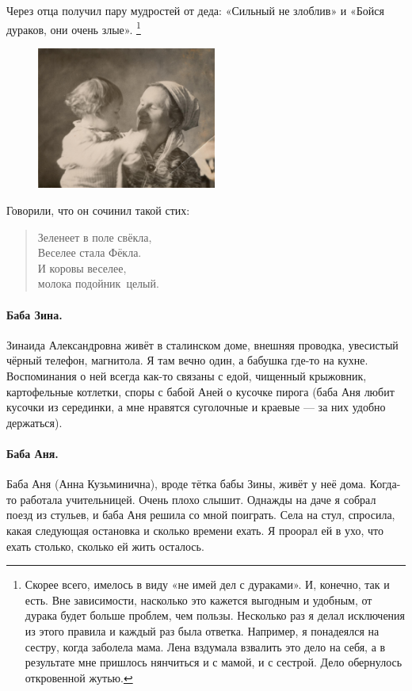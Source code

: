 \documentclass{book}
\begin{document}
Через отца получил пару мудростей от деда: «Сильный не злоблив» и «Бойся дураков, они очень злые».%
\footnote{Скорее всего, имелось в виду «не имей дел с дураками». 
И, конечно, так и есть.
Вне зависимости, насколько это кажется выгодным и удобным, от дурака будет больше проблем, чем пользы.
Несколько раз я делал исключения из этого правила и каждый раз была ответка.
Например, я понадеялся на сестру, когда заболела мама.
Лена вздумала взвалить это дело на себя, а в результате мне пришлось нянчиться и с мамой, и с сестрой.
Дело обернулось откровенной жутью.}

\begin{figure}
\vskip-4mm
\centering
\includegraphics[width=59mm,angle=0]{pics/lena-baba-zina}
\vskip-12mm
\end{figure}

Говорили, что он сочинил такой стих:
\begin{verse}
Зеленеет в поле \mbox{свёкла},
\\
\quad Веселее стала \mbox{Фёкла.}
\\
И коровы веселее,
\\
\quad молока \mbox{подойник целый.}
\end{verse}

\paragraph{Баба Зина.}
Зинаида Александровна живёт в сталинском доме, внешняя проводка, увесистый чёрный телефон, магнитола.
Я там вечно один, а бабушка где-то на кухне.
Воспоминания о ней всегда как-то связаны с едой,
чищенный крыжовник, 
картофельные котлетки,
споры с бабой Аней о кусочке пирога (баба Аня любит кусочки из серединки, а мне нравятся суголочные и краевые --- за них удобно держаться).

\paragraph{Баба Аня.}
Баба Аня (Анна Кузьминична), вроде тётка бабы Зины, живёт у неё дома.
Когда-то работала учительницей.
Очень плохо слышит.
Однажды на даче я собрал поезд из стульев, и баба Аня решила со мной поиграть.
Села на стул, спросила, какая следующая остановка и сколько времени ехать.
Я проорал ей в ухо, что ехать столько, сколько ей жить осталось.
\end{document}
